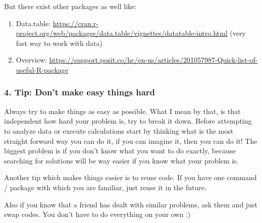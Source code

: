 \documentclass[
]{article}
\begin{document}
But there exist other packages as well like:

\begin{enumerate}
\def\labelenumi{\arabic{enumi}.}
\item
  Data.table:
  \url{https://cran.r-project.org/web/packages/data.table/vignettes/datatable-intro.html}
  (very fast way to work with data)
\item
  Overview:
  \href{https://support.posit.co/hc/en-us/articles/201057987-Quick-list-of-useful-R-packages}{https://support.posit.co/hc/en-us/articles/201057987-Quick-list-of-useful-R-package}
\end{enumerate}

\hypertarget{tip-dont-make-easy-things-hard}{%
\subsubsection{4. Tip: Don't make easy things
hard}\label{tip-dont-make-easy-things-hard}}

Always try to make things as easy as possible. What I mean by that, is
that independent how hard your problem is, try to break it down. Before
attempting to analyze data or execute calculations start by thinking
what is the most straight forward way you can do it, if you can imagine
it, then you can do it! The biggest problem is if you don't know what
you want to do exactly, because searching for solutions will be way
easier if you know what your problem is.

Another tip which makes things easier is to reuse code. If you have one
command / package with which you are familiar, just reuse it in the
future.

Also if you know that a friend has dealt with similar problems, ask them
and just swap codes. You don't have to do everything on your own :)
\end{document}
